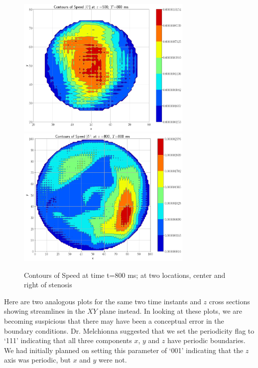 \documentclass[11pt]{article} %
\begin{document}
\begin{figure}[H]
\centering
\hspace*{-0.25in}
\includegraphics[width=0.75\textwidth]{contour_speed/contour_speed_z_500_t_800.png}
\hspace*{-0.25in}
\includegraphics[width=0.75\textwidth]{contour_speed/contour_speed_z_800_t_800.png}
\caption{Contours of Speed at time t=800 ms; at two locations, center and right of stenosis}
\end{figure}

Here are two analogous plots for the same two time instants and $z$ cross sections showing
streamlines in the $XY$ plane instead.
In looking at these plots, we are becoming suspicious that there may have been a 
conceptual error in the boundary conditions.  
Dr. Melchionna suggested that we set the periodicity flag to `111' indicating that all three
components $x$, $y$ and $z$ have periodic boundaries.
We had initially planned on setting this parameter of `001' indicating that the $z$ axis
was periodic, but $x$ and $y$ were not.
\end{document}
